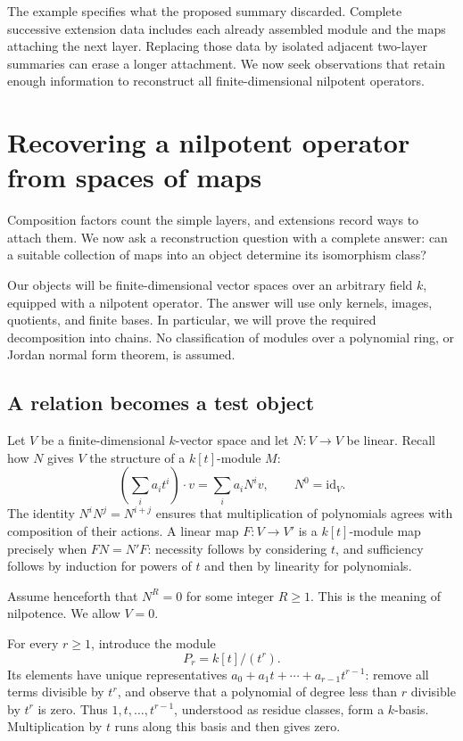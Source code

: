 \documentclass[11pt]{article}
\theoremstyle{definition}
\theoremstyle{remark}\newtheorem{remark}[theorem]{Remark}
\newcommand{\id}{\mathrm{id}}
\begin{document}
The example specifies what the proposed summary discarded. Complete
successive extension data includes each already assembled module and
the maps attaching the next layer. Replacing those data by isolated
adjacent two-layer summaries can erase a longer attachment. We now
seek observations that retain enough information to reconstruct all
finite-dimensional nilpotent operators.



\section{Recovering a nilpotent operator from spaces of maps}
\label{p:probes}

Composition factors count the simple layers, and extensions record ways to
attach them. We now ask a reconstruction question with a complete answer:
can a suitable collection of maps into an object determine its isomorphism
class?

Our objects will be finite-dimensional vector spaces over an arbitrary field
$k$, equipped with a nilpotent operator. The answer will use only kernels,
images, quotients, and finite bases. In particular, we will prove the required
decomposition into chains. No classification of modules over a polynomial
ring, or Jordan normal form theorem, is assumed.

\subsection{A relation becomes a test object}
\label{p:relation-probe}

Let $V$ be a finite-dimensional $k$-vector space and let $N:V\to V$ be linear.
Recall how $N$ gives $V$ the structure of a $k[t]$-module $M$:
\[
 \left(\sum_i a_it^i\right)\!\cdot v=\sum_i a_iN^iv,
 \qquad N^0=\id_V.
\]
The identity $N^iN^j=N^{i+j}$ ensures that multiplication of polynomials
agrees with composition of their actions. A linear map $F:V\to V'$ is a
$k[t]$-module map precisely when $FN=N'F$: necessity follows by considering
$t$, and sufficiency follows by induction for powers of $t$ and then by
linearity for polynomials.

Assume henceforth that $N^R=0$ for some integer $R\geq1$. This is the
meaning of nilpotence. We allow $V=0$.

For every $r\geq1$, introduce the module
\[
 P_r=k[t]/(t^r).
\]
Its elements have unique representatives
$a_0+a_1t+\cdots+a_{r-1}t^{r-1}$: remove all terms divisible by $t^r$, and
observe that a polynomial of degree less than $r$ divisible by $t^r$ is zero.
Thus $1,t,\ldots,t^{r-1}$, understood as residue classes, form a $k$-basis.
Multiplication by $t$ runs along this basis and then gives zero.
\end{document}
